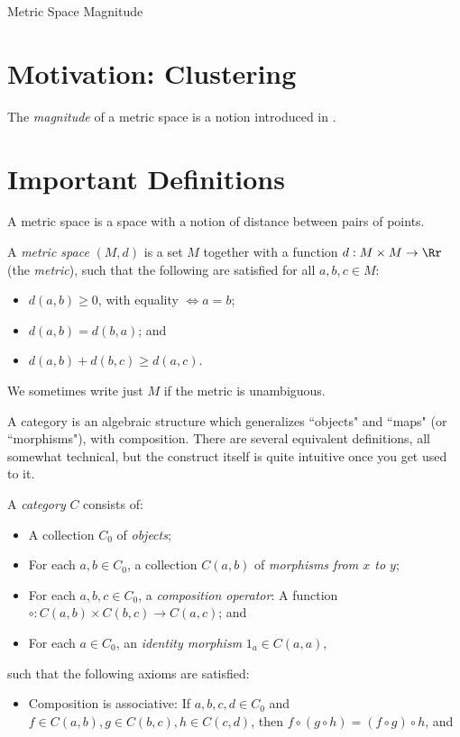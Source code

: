 \documentclass[12pt]{pom_thesis}
\begin{document}
\begin{chapter}{Metric Space Magnitude}
\section{Motivation: Clustering}
The \emph{magnitude} of a metric space is a notion introduced in \cite{Lein2}. %
\section{Important Definitions} \label{mag_defs}
A metric space is a space with a notion of distance between pairs of points. 
\begin{defn}
A \textit{metric space} $(M,d)$ is a set $M$ together with a function  $d:M \times M \rightarrow \Rr$ (the \emph{metric}), such that the following are satisfied for all $a,b,c \in M$:
\begin{itemize}
\item $d(a,b) \geq 0$, with equality $\iff a = b$;
\item $d(a,b) = d(b,a)$; and
\item $d(a,b) + d(b,c) \geq d(a,c)$.
\end{itemize}
We sometimes write just $M$ if the metric is unambiguous.
\end{defn}
A category is an algebraic structure which generalizes ``objects" and ``maps" (or ``morphisms"), with composition. There are several equivalent definitions, all somewhat technical, but the construct itself is quite intuitive once you get used to it.  
\begin{defn}
A \textit{category} $C$ consists of:
\begin{itemize}
\item A collection $C_0$ of \emph{objects};
\item For each $a,b \in C_0$, a collection $C(a,b)$ of \emph{morphisms from $x$ to $y$};
\item For each $a,b,c \in C_0$, a \emph{composition operator}: A function $\circ:C(a,b) \times C(b,c) \rightarrow C(a,c)$; and
\item For each $a \in C_0$, an \emph{identity morphism} $1_a \in C(a,a)$,
\end{itemize}
such that the following axioms are satisfied:
\begin{itemize}
\item Composition is associative: If $a,b,c,d \in C_0$ and $f\in C(a,b), g \in C(b,c), h \in C(c,d)$, then $f \circ (g \circ h) = (f \circ g) \circ h$, and

\end{itemize}
\end{defn}
\end{chapter}
\end{document}
